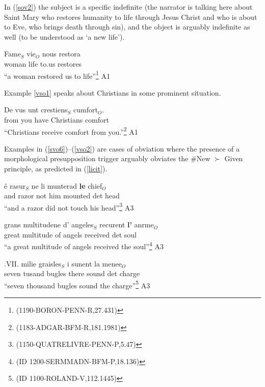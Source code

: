\documentclass[output=paper,modfonts,nonflat]{langsci/langscibook}
\begin{document}
In (\ref{sov2}) the subject is a specific indefinite (the narrator is talking here about Saint Mary who restores humanity to life through Jesus Christ and who is about to Eve, who brings death through sin), and the object is arguably indefinite as well (to be understood as `a new life').

\ea
\gll Fame$_{S}$ vie$_{O}$ nous restora\\
woman life to.us restores\\
\glt ``a woman restored us to life''\footnote{\scriptsize{(1190-BORON-PENN-R,27.431)}}\label{sov2} \hfill A1
\z

Example \ref{vso1} speaks about Christians in some prominent situation.

\ea
\gll De vus unt crestiens$_{S}$ cumfort$_{O}$.\\
from you have Christians comfort\\
\glt ``Christians receive comfort from you.''\footnote{\scriptsize{(1183-ADGAR-BFM-R,181.1981)}}\label{vso1} \hfill A1
\z

Examples in (\ref{svo6})--(\ref{vso2}) are cases of obviation where the presence of a morphological presupposition trigger arguably obviates the \#New $\succ$ Given principle, as predicted in (\ref{licit}).

\ea
\gll \'{e} rasur$_{S}$ ne li munterad {\bf le} chief$_{O}$\\
and razor not him mounted {\sc det} head\\
\glt ``and a razor did not touch his head''\footnote{\scriptsize{(1150-QUATRELIVRE-PENN-P,5.47)}}\label{svo6} \hfill A3
\z

\ea
\gll grans multitudene d' angeles$_{S}$ recurent {\bf l'} anrme$_{O}$\\
great multitude of angels received {\sc det} soul\\
\glt ``a great multitude of angels received the soul''\footnote{\scriptsize{(ID 1200-SERMMADN-BFM-P,18.136)}}\label{svo7} \hfill A3
\z



\ea 
\gll .VII. milie graisles$_{S}$ i sunent la menee$_{O}$\\
seven tusand bugles there sound {\sc det} charge\\ 
\glt ``seven thousand bugles sound the charge''\footnote{\scriptsize{(ID 1100-ROLAND-V,112.1445)}}\label{sov3}  \hfill A3
\z 
\end{document}
